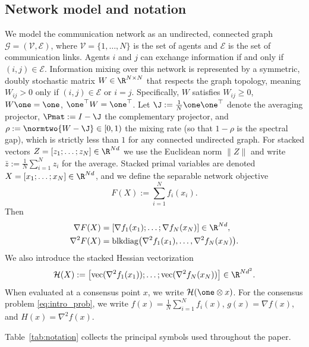 \documentclass[review,onefignum,onetabnum]{siamart171218}
\begin{document}
	\subsection{Network model and notation}
	We model the communication network as an undirected, connected
	graph $\mathcal{G} = (\mathcal{V}, \mathcal{E})$, where
	$\mathcal{V} = \{1, \dots, N\}$ is the set of agents and
	$\mathcal{E}$ is the set of communication links.
	Agents $i$ and $j$ can exchange information if and only if
	$(i,j) \in \mathcal{E}$.
	Information mixing over this network is represented by a symmetric,
	doubly stochastic matrix $W \in \R^{N \times N}$ that respects
	the graph topology, meaning $W_{ij} > 0$ only if
	$(i,j) \in \mathcal{E}$ or $i=j$.
	Specifically, $W$ satisfies
	$W_{ij}\ge0$, $W\one=\one$, $\one^\top W=\one^\top$.
	Let $\J:=\frac{1}{N}\one\one^\top$ denote the averaging projector,
	$\Pmat:=I-\J$ the complementary projector, and
	$\rho := \normtwo{W-\J}\in[0,1)$ the mixing rate (so that $1{-}\rho$ is the spectral gap), which is
	strictly less than $1$ for any connected undirected graph.
	For stacked vectors $Z=[z_1;\dots;z_N]\in\R^{Nd}$ we use the
	Euclidean norm $\|Z\|$ and write $\bar z:=\frac1N\sum_{i=1}^N z_i$
	for the average.
	Stacked primal variables are denoted
	$X=[x_1;\dots;x_N]\in\R^{Nd}$, and we define the separable
	network objective
	\[
	F(X):=\sum_{i=1}^N f_i(x_i).
	\]
	Then
	\begin{align*}
	\nabla F(X)&=[\nabla f_1(x_1);\dots;\nabla f_N(x_N)]\in\R^{Nd},\\
	\nabla^2 F(X)&=\mathrm{blkdiag}\bigl(\nabla^2 f_1(x_1),\dots,\nabla^2 f_N(x_N)\bigr).
	\end{align*}
	We also introduce the stacked Hessian vectorization
	\[
	\mathcal H(X):=\bigl[\mathrm{vec}(\nabla^2 f_1(x_1));\dots;\mathrm{vec}(\nabla^2 f_N(x_N))\bigr]\in\R^{Nd^2}.
	\]
	When evaluated at a consensus point $x$, we write $\mathcal H(\one\otimes x)$.
	For the consensus problem \eqref{eq:intro_prob}, we write
	$f(x)=\frac1N\sum_{i=1}^N f_i(x)$, $g(x)=\nabla f(x)$, and $H(x)=\nabla^2 f(x)$.
	
	Table~\ref{tab:notation} collects the principal symbols used
	throughout the paper.
	
\end{document}
